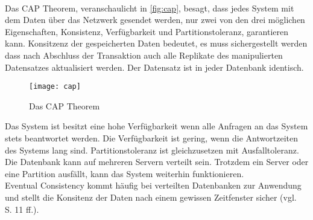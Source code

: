 \\
Das \gls{CAP} Theorem, veranschaulicht in \autoref{fig:cap}, besagt, dass jedes System mit dem Daten über das Netzwerk gesendet werden, nur zwei von den drei möglichen Eigenschaften, Konsistenz, Verfügbarkeit und Partitionstoleranz, garantieren kann.
Konsitzenz der gespeicherten Daten bedeutet, es muss sichergestellt werden dass nach Abschluss der Transaktion auch alle Replikate des manipulierten Datensatzes aktualisiert werden. Der Datensatz ist in jeder Datenbank identisch.
%
\begin{figure}[H]
  \centering
  \texttt{[image: cap]}
  \grayRule
  \caption{Das CAP Theorem}
  \label{fig:cap}
\end{figure}
%
Das System ist besitzt eine hohe Verfügbarkeit wenn alle Anfragen an das System stets beantwortet werden. Die Verfügbarkeit ist gering, wenn die Antwortzeiten des Systems lang sind.
Partitionstoleranz ist gleichzusetzen mit Ausfalltoleranz. Die Datenbank kann auf mehreren Servern verteilt sein. Trotzdem ein Server oder eine Partition ausfällt, kann das System weiterhin funktionieren.\\
Eventual Consistency kommt häufig bei verteilten Datenbanken zur Anwendung und stellt die Konsitenz der Daten nach einem gewissen Zeitfenster sicher (vgl. ~\cite{couchDB} S. 11 ff.). 
